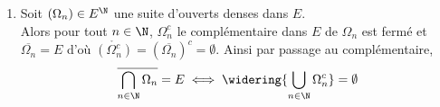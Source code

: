\documentclass{book}
\begin{document}
\begin{enumerate}[leftmargin=*]
		Soit $k>n$ deux entiers non nuls.\\
		Par définition, $x_k\in B(x_n,r_n)$ donc $||x_n-x_k||<r_n\leq \displaystyle\frac{1}{n}$. Ainsi, $(x_n)_{n\in \N^*}$ est de Cauchy.\\\\
		Or $E$ est complet donc $(x_n)_{n\in \N^*}$ converge. On note $x$ sa limite.\\
		Toujours par définition, $\forall n\in \N^*,\ \forall k\geq n,\ x_k\in B_f(x_n,r_n)$. Toutes ces boules sont des fermés donc par caractérisation séquentielle, $x\in \displaystyle\bigcap\limits_{n\in \N^*}B_f(x_n,r_n)$.\\
		Et donc, $x\in \displaystyle\bigcap\limits_{n\in \N^*}\Omega_n$. et $x\in V$ car $x\in B_f(x_1,r_1)$.\\
		Ainsi, $x\in V\cap\displaystyle\bigcap\limits_{n\in \N^*}\Omega_n$.
		\item Soit $(\Omega_n)\in E^\N$ une suite d'ouverts denses dans $E$.\\
		Alors pour tout $n\in \N$, $\Omega_n^c$ le complémentaire dans $E$ de $\Omega_n$ est fermé et $\overline{\Omega_n}=E$ d'où $\ring{(\Omega_n^c)}=(\overline{\Omega_n})^c=\emptyset$. Ainsi par passage au complémentaire,
		$$\displaystyle\overline{\bigcap\limits_{n\in \N}\Omega_n}=E\iff \widering{\bigcup\limits_{n\in \N}\Omega_n^c}=\emptyset$$
	\end{enumerate}
	
\end{document}
